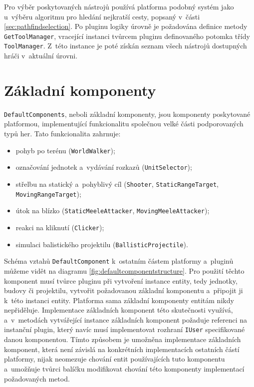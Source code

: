 Pro výběr poskytovaných nástrojů používá platforma podobný systém jako u~výběru algoritmu pro hledání nejkratší cesty, popsaný v~části \ref{sec:pathfindselection}. Po pluginu logiky úrovně je požadována definice metody \texttt{GetToolManager}, vracející instanci tvůrcem pluginu definovaného potomka třídy \texttt{ToolManager}. Z~této instance je poté získán seznam  všech nástrojů dostupných hráči v~aktuální úrovni.

\section{Základní komponenty}
\label{sec:defaultcomponents}
\texttt{DefaultComponents}, neboli základní komponenty, jsou komponenty poskytované platformou, implementující funkcionalitu společnou velké části podporovaných typů her. Tato funkcionalita zahrnuje:

\begin{itemize}
	\item pohyb po terénu (\texttt{WorldWalker});
	\item označování jednotek a~vydávání rozkazů (\texttt{UnitSelector});
	\item střelbu na statický a~pohyblivý cíl (\texttt{Shooter}, \texttt{StaticRangeTarget},\\ \texttt{MovingRangeTarget});
	\item útok na blízko (\texttt{StaticMeeleAttacker}, \texttt{MovingMeeleAttacker});
	\item reakci na kliknutí (\texttt{Clicker});
	\item simulaci balistického projektilu (\texttt{BallisticProjectile}).
\end{itemize}

Schéma vztahů \texttt{DefaultComponent} k~ostatním částem platformy a~pluginů můžeme vidět na diagramu \ref{fig:defaultcomponentstructure}. Pro použití těchto komponent musí tvůrce pluginu při vytvoření instance entity, tedy jednotky, budovy či projektilu, vytvořit požadovanou základní komponentu a~připojit ji k~této instanci entity. Platforma sama základní komponenty entitám nikdy nepřiděluje. Implementace základních komponent této skutečnosti využívá, a~v~metodách vytvářející instance základních komponent požaduje referenci na instanční plugin, který navíc musí implementovat rozhraní \texttt{IUser} specifikované danou komponentou. Tímto způsobem je umožněna implementace základních komponent, která není závislá na konkrétních implementacích ostatních částí platformy, nijak neomezuje chování entit používajících tuto komponentu a~umožňuje tvůrci balíčku modifikovat chování této komponenty implementací požadovaných metod. 

